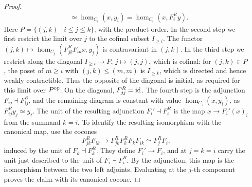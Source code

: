 \begin{proof}
\begin{align*}
			&\simeq \hom_{C_i}(x,y_i) = \hom_{C_i}(x,F_i^Ry).
		\end{align*}
		Here $P = \{(j,k) \mid i \leq j \leq k\}$, with the product order. In the second step we first restrict the limit over $j$ to the cofinal subset $I_{\geq i}$. The functor $(j,k) \mapsto \hom_{C_j}(F_{jk}^RF_{ik}x,y_j)$ is contravariant in $(j,k)$. In the third step we restrict along the diagonal $I_{\geq i} \to P$, $j \mapsto (j,j)$, which is cofinal: for $(j,k) \in P$, the poset of $m \geq i$ with $(j,k) \leq (m,m)$ is $I_{\geq k}$, which is directed and hence weakly contractible. Thus the opposite of the diagonal is initial, as required for this limit over $P^{\textup{op}}$. On the diagonal, $F_{jj}^R = \operatorname{id}$. The fourth step is the adjunction $F_{ij} \dashv F_{ij}^R$, and the remaining diagram is constant with value $\hom_{C_i}(x,y_i)$, as $F_{ij}^Ry_j \simeq y_i$. The unit of the resulting adjunction $F_i' \dashv F_i^R$ is the map $x \to F_i'(x)_i$ from the summand $k=i$. To identify the resulting isomorphism with the canonical map, use the cocones
		\[
			F_{jk}^RF_{ik} \longrightarrow F_{jk}^RF_k^RF_kF_{ik} \simeq F_j^RF_i,
		\]
		induced by the unit of $F_k \dashv F_k^R$. They define $F_i' \to F_i$, and at $j=k=i$ carry the unit just described to the unit of $F_i \dashv F_i^R$. By the adjunction, this map is the isomorphism between the two left adjoints. Evaluating at the $j$-th component proves the claim with its canonical cocone.
	\end{proof}


